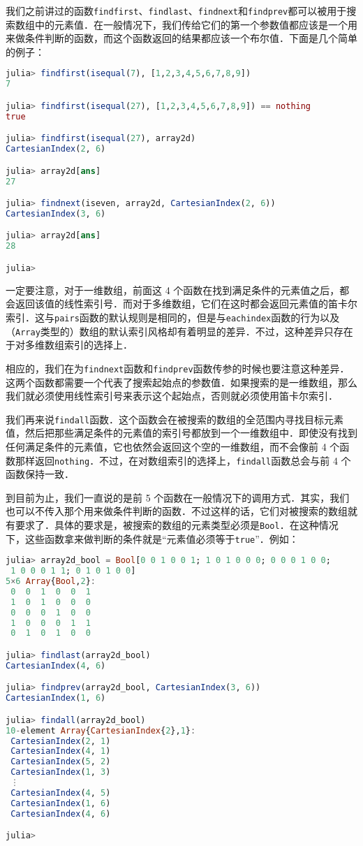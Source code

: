 我们之前讲过的函数\verb|findfirst|、\verb|findlast|、\verb|findnext|和\verb|findprev|都可以被用于搜索数组中的元素值．在一般情况下，我们传给它们的第一个参数值都应该是一个用来做条件判断的函数，而这个函数返回的结果都应该一个布尔值．下面是几个简单的例子：

\begin{lstlisting}[language=julia]
julia> findfirst(isequal(7), [1,2,3,4,5,6,7,8,9])
7

julia> findfirst(isequal(27), [1,2,3,4,5,6,7,8,9]) == nothing
true

julia> findfirst(isequal(27), array2d)
CartesianIndex(2, 6)

julia> array2d[ans]
27

julia> findnext(iseven, array2d, CartesianIndex(2, 6))
CartesianIndex(3, 6)

julia> array2d[ans]
28

julia> 
\end{lstlisting}

一定要注意，对于一维数组，前面这 4 个函数在找到满足条件的元素值之后，都会返回该值的线性索引号．而对于多维数组，它们在这时都会返回元素值的笛卡尔索引．这与\verb|pairs|函数的默认规则是相同的，但是与\verb|eachindex|函数的行为以及（\verb|Array|类型的）数组的默认索引风格却有着明显的差异．不过，这种差异只存在于对多维数组索引的选择上．

相应的，我们在为\verb|findnext|函数和\verb|findprev|函数传参的时候也要注意这种差异．这两个函数都需要一个代表了搜索起始点的参数值．如果搜索的是一维数组，那么我们就必须使用线性索引号来表示这个起始点，否则就必须使用笛卡尔索引．

我们再来说\verb|findall|函数．这个函数会在被搜索的数组的全范围内寻找目标元素值，然后把那些满足条件的元素值的索引号都放到一个一维数组中．即使没有找到任何满足条件的元素值，它也依然会返回这个空的一维数组，而不会像前 4 个函数那样返回\verb|nothing|．不过，在对数组索引的选择上，\verb|findall|函数总会与前 4 个函数保持一致．

到目前为止，我们一直说的是前 5 个函数在一般情况下的调用方式．其实，我们也可以不传入那个用来做条件判断的函数．不过这样的话，它们对被搜索的数组就有要求了．具体的要求是，被搜索的数组的元素类型必须是\verb|Bool|．在这种情况下，这些函数拿来做判断的条件就是“元素值必须等于\verb|true|”．例如：

\begin{lstlisting}[language=julia]
julia> array2d_bool = Bool[0 0 1 0 0 1; 1 0 1 0 0 0; 0 0 0 1 0 0;
 1 0 0 0 1 1; 0 1 0 1 0 0]
5×6 Array{Bool,2}:
 0  0  1  0  0  1
 1  0  1  0  0  0
 0  0  0  1  0  0
 1  0  0  0  1  1
 0  1  0  1  0  0

julia> findlast(array2d_bool)
CartesianIndex(4, 6)

julia> findprev(array2d_bool, CartesianIndex(3, 6))
CartesianIndex(1, 6)

julia> findall(array2d_bool)
10-element Array{CartesianIndex{2},1}:
 CartesianIndex(2, 1)
 CartesianIndex(4, 1)
 CartesianIndex(5, 2)
 CartesianIndex(1, 3)
 ⋮                   
 CartesianIndex(4, 5)
 CartesianIndex(1, 6)
 CartesianIndex(4, 6)

julia> 
\end{lstlisting}

